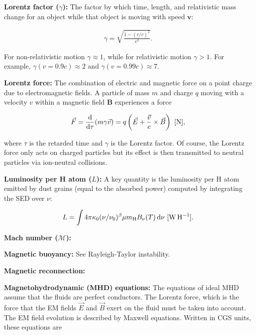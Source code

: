 \documentclass[a4paper,10pt]{article}
\begin{document}
{\noindent}\textbf{Lorentz factor ($\gamma$):} The factor by which time, length, and relativistic mass change for an object while that object is moving with speed $\mathbf{v}$:

\begin{align*}
    \gamma = \sqrt{\frac{1-(v/c)^2}{c^2}}.
\end{align*}

{\noindent}For non-relativistic motion $\gamma\approx1$, while for relativistic motion $\gamma>1$. For example, $\gamma(v=0.9c)\approx2$ and $\gamma(v=0.99c)\approx7$.

{\noindent}\textbf{Lorentz force:} The combination of electric and magnetic force on a point charge due to electromagnetic fields. A particle of mass $m$ and charge $q$ moving with a velocity $v$ within a magnetic field $\mathbf{B}$ experiences a force 

\begin{align*}
    \vec{F} = \dfrac{\mathrm{d}}{\mathrm{d}\tau} (m\gamma\vec{v}) = q\left(\vec{E} + \dfrac{\vec{v}}{c}\times\vec{B}\right) ~ [{\rm N}],
\end{align*}

{\noindent}where $\tau$ is the retarded time and $\gamma$ is the Lorentz factor. Of course, the Lorentz force only acts on charged particles but its effect is then transmitted to neutral particles via ion-neutral collisions.

{\noindent}\textbf{Luminosity per H atom ($L$):} A key quantity is the luminosity per H atom emitted by dust grains (equal to the absorbed power) computed by integrating the SED over $\nu$:

\begin{align*}
    L = \int 4\pi\kappa_0(\nu/\nu_0)^\beta \mu m_{\rm H}B_\nu(T) \,{\rm d}\nu ~ [{\rm W\,H^{-1}}].
\end{align*}

{\noindent}\textbf{Mach number ($\mathcal{M}$):}

{\noindent}\textbf{Magnetic buoyancy:} See Rayleigh-Taylor instability.

{\noindent}\textbf{Magnetic reconnection:}

{\noindent}\textbf{Magnetohydrodynamic (MHD) equations:} The equations of ideal MHD assume that the fluids are perfect conductors. The Lorentz force, which is the force that the EM fields $\vec{E}$ and $\vec{B}$ exert on the fluid must be taken into account. The EM field evolution is described by Maxwell equations. Written in CGS units, these equations are
\end{document}
